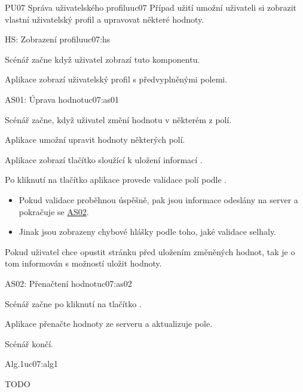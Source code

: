 \begin{usecase}{PU07 Správa uživatelského profilu}{uc07}
    Případ užití umožní uživateli si zobrazit vlastní uživatelský profil a upravovat některé hodnoty.

    \begin{scenario}{HS: Zobrazení profilu}{uc07:hs}
        \item Scénář začne když uživatel zobrazí tuto komponentu.
        \item Aplikace zobrazí uživatelský profil s předvyplněnými polemi.
    \end{scenario}

    \begin{scenario}{AS01: Úprava hodnot}{uc07:as01}
        \item Scénář začne, když uživatel změní hodnotu v některém z polí.
        \item Aplikace umožní upravit hodnoty některých polí.
        \item Aplikace zobrazí tlačítko sloužící k uložení informací .
        \item Po kliknutí na tlačítko  aplikace provede validace polí podle .
        \begin{itemize}
            \item Pokud validace proběhnou úspěšně, pak jsou informace odeslány na server a pokračuje se \hyperref[uc02:as02]{AS02}.
            \item Jinak jsou zobrazeny chybové hlášky podle toho, jaké validace selhaly.
        \end{itemize}
        \item Pokud uživatel chce opustit stránku před uložením změněných hodnot, tak je o tom informován s možností uložit hodnoty.
    \end{scenario}

    \begin{scenario}{AS02: Přenačtení hodnot}{uc07:as02}
        \item Scénář začne po kliknutí na tlačítko .
        \item Aplikace přenačte hodnoty ze serveru a aktualizuje pole.
        \item Scénář končí.        
    \end{scenario}

    \begin{scenario}{Alg.1}{uc07:alg1}
        \item TODO
    \end{scenario}
\end{usecase}